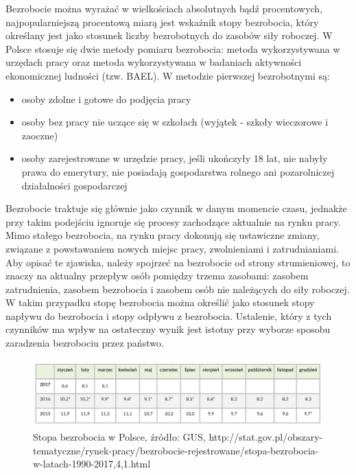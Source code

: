 \documentclass[12pt]{extarticle}
\begin{document}
Bezrobocie można wyrażać w wielkościach absolutnych bądź procentowych, najpopularniejszą procentową miarą jest wskaźnik stopy bezrobocia, który określany jest jako stosunek liczby bezrobotnych do zasobów siły roboczej. W Polsce stosuje się dwie metody pomiaru bezrobocia: metoda wykorzystywana w urzędach pracy oraz metoda wykorzystywana w badaniach aktywności ekonomicznej ludności (tzw. BAEL). W metodzie pierwszej bezrobotnymi są:

\begin{itemize}
	\item osoby zdolne i gotowe do podjęcia pracy
    \item osoby bez pracy nie uczące się w szkołach (wyjątek - szkoły wieczorowe i zaoczne)
	\item osoby zarejestrowane w urzędzie pracy, jeśli ukończyły 18 lat, nie nabyły prawa do emerytury, nie posiadają gospodarstwa rolnego ani pozarolniczej działalności gospodarczej
\end{itemize}

Bezrobocie traktuje się głównie jako czynnik w danym momencie czasu, jednakże przy takim podejściu ignoruje się procesy zachodzące aktualnie na rynku pracy. Mimo stałego bezrobocia, na rynku pracy dokonują się ustawiczne zmiany, związane z powstawaniem nowych miejsc pracy, zwolnieniami i zatrudnianiami. Aby opisać te zjawiska, należy spojrzeć na bezrobocie od strony strumieniowej, to znaczy na aktualny przepływ osób pomiędzy trzema zasobami: zasobem zatrudnienia, zasobem bezrobocia i zasobem osób nie należących do siły roboczej. W takim przypadku stopę bezrobocia można określić jako stosunek stopy napływu do bezrobocia i stopy odpływu z bezrobocia. Ustalenie, który z tych czynników ma wpływ na ostateczny wynik jest istotny przy wyborze sposobu zaradzenia bezrobociu przez państwo.

\begin{figure}[H]
\centering
\includegraphics[width=15cm]{bezrobocie_polska}
    \caption{Stopa bezrobocia w Polsce, źródło: GUS, http://stat.gov.pl/obszary-tematyczne/rynek-pracy/bezrobocie-rejestrowane/stopa-bezrobocia-w-latach-1990-2017,4,1.html}
\end{figure}
\end{document}
